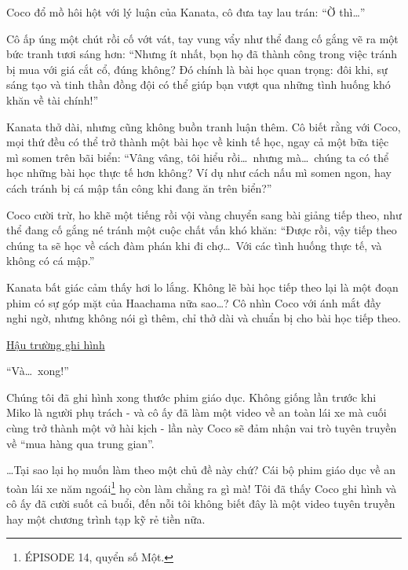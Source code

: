 \documentclass[../main.tex]{subfiles}
\begin{document}
Coco đổ mồ hôi hột với lý luận của Kanata, cô đưa tay lau trán: ``Ờ thì\dots''

Cô ấp úng một chút rồi cố vớt vát, tay vung vẩy như thể đang cố gắng vẽ ra một bức tranh tươi sáng hơn: ``Nhưng ít nhất, bọn họ đã thành công trong việc tránh bị mua với giá cắt cổ, đúng không? Đó chính là bài học quan trọng: đôi khi, sự sáng tạo và tinh thần đồng đội có thể giúp bạn vượt qua những tình huống khó khăn về tài chính!''

Kanata thở dài, nhưng cũng không buồn tranh luận thêm. Cô biết rằng với Coco, mọi thứ đều có thể trở thành một bài học về kinh tế học, ngay cả một bữa tiệc mì somen trên bãi biển: ``Vâng vâng, tôi hiểu rồi\dots\ nhưng mà\dots\ chúng ta có thể học những bài học thực tế hơn không? Ví dụ như cách nấu mì somen ngon, hay cách tránh bị cá mập tấn công khi đang ăn trên biển?''

Coco cười trừ, ho khẽ một tiếng rồi vội vàng chuyển sang bài giảng tiếp theo, như thể đang cố gắng né tránh một cuộc chất vấn khó khăn: ``Được rồi, vậy tiếp theo chúng ta sẽ học về cách đàm phán khi đi chợ\dots\ Với các tình huống thực tế, và không có cá mập.''

Kanata bất giác cảm thấy hơi lo lắng. Không lẽ bài học tiếp theo lại là một đoạn phim có sự góp mặt của Haachama nữa sao\dots? Cô nhìn Coco với ánh mắt đầy nghi ngờ, nhưng không nói gì thêm, chỉ thở dài và chuẩn bị cho bài học tiếp theo.

\omk


\begin{center}
  \uline{Hậu trường ghi hình}
\end{center}

``Và\dots\ xong!''

Chúng tôi đã ghi hình xong thước phim giáo dục. Không giống lần trước khi Miko là người phụ trách - và cô ấy đã làm một video về an toàn lái xe mà cuối cùng trở thành một vở hài kịch - lần này Coco sẽ đảm nhận vai trò tuyên truyền về ``mua hàng qua trung gian''.

\dots Tại sao lại họ muốn làm theo một chủ đề này chứ? Cái bộ phim giáo dục về an toàn lái xe năm ngoái\footnote{{\flaregothic ÉPISODE 14}, quyển số Một.} họ còn làm chẳng ra gì mà! Tôi đã thấy Coco ghi hình và cô ấy đã cười suốt cả buổi, đến nỗi tôi không biết đây là một video tuyên truyền hay một chương trình tạp kỹ rẻ tiền nữa.
\end{document}
